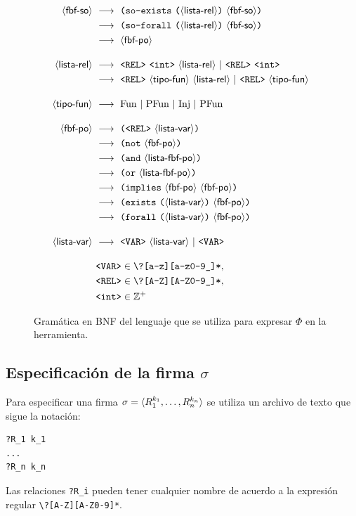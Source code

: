 \begin{figure}[h]
\begin{alignat*}{1}
\sofbf\   & \deriv\ \lpar \SOExists\ \lpar \listrel \rpar\ \sofbf \rpar \\
          & \deriv\ \lpar \SOForall\ \lpar \listrel \rpar\ \sofbf \rpar \\
          & \deriv\ \pofbf \\[1em]
\listrel\ & \deriv\ \rel\ \integer\ \listrel\ |\ \rel\ \integer \\
          & \deriv\ \rel\ \tipof\ \listrel\ |\ \rel\ \tipof\ \\[1em]
\tipof\   & \deriv\ \Fun\ |\ \PFun\ |\ \Inj\ |\ \PInj\ \\[1em]
\pofbf\   & \deriv\ \lpar \rel\ \listvar \rpar \\
          & \deriv\ \lpar \NOT\ \pofbf \rpar \\
          & \deriv\ \lpar \AND\ \listpofbf \rpar \\
          & \deriv\ \lpar \OR\ \listpofbf \rpar \\
          & \deriv\ \lpar \IMPLIES\ \pofbf\ \pofbf \rpar \\
          & \deriv\ \lpar \Exists\ \lpar \listvar \rpar\ \pofbf \rpar \\
          & \deriv\ \lpar \Forall\ \lpar \listvar \rpar\ \pofbf \rpar \\[1em]
\listvar\ & \deriv\ \var\ \listvar\ |\ \var \\[1em]
& \var \in \texttt{\textbackslash?[a-z][a-z0-9\_]*}, \\
& \rel \in \texttt{\textbackslash?[A-Z][A-Z0-9\_]*}, \\
& \integer \in \mathbb{Z}^+ \\
\end{alignat*}
\label{gramatica}
\caption{Gramática en BNF del lenguaje que se utiliza para expresar $\Phi$ en
la herramienta.}
\end{figure}

\subsection{Especificación de la firma $\sigma$}
Para especificar una firma $\sigma = \tup{R_1^{k_1},\ldots,R_n^{k_n}}$ se
utiliza un archivo de texto que sigue la notación:
\begin{verbatim}
?R_1 k_1
...
?R_n k_n
\end{verbatim}
Las relaciones \texttt{?R\_i} pueden tener cualquier nombre de acuerdo a la
expresión regular \texttt{\textbackslash?[A-Z][A-Z0-9]*}.

